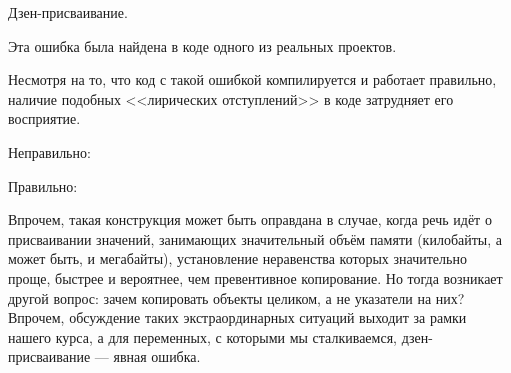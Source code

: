 \begin{typerror}
	\label{TE_if-not-equals-make-equal}
	Дзен-присваивание.

	Эта ошибка была найдена в коде одного из реальных проектов.

	Несмотря на то, что код с такой ошибкой компилируется и работает правильно,
	наличие подобных <<лирических отступлений>> в коде затрудняет его восприятие.

	Неправильно:

	Правильно:

	Впрочем, такая конструкция может быть оправдана в случае,
	когда речь идёт о присваивании значений, занимающих значительный объём памяти (килобайты, а может быть, и мегабайты),
	установление неравенства которых значительно проще, быстрее и вероятнее, чем превентивное копирование.
	Но тогда возникает другой вопрос: зачем копировать объекты целиком, а не указатели на них?
	Впрочем, обсуждение таких экстраординарных ситуаций выходит за рамки нашего курса,
	а для переменных, с которыми мы сталкиваемся, дзен-присваивание --- явная ошибка.

\end{typerror}
